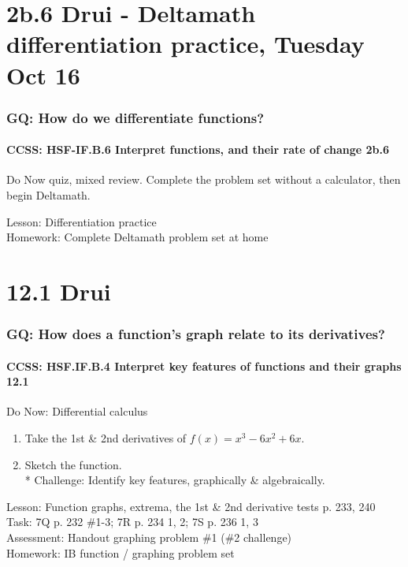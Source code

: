 \documentclass{beamer}
\begin{document}
\section{2b.6 Drui - Deltamath differentiation practice, Tuesday Oct 16}
  \frame
  {
    \frametitle{GQ: How do we differentiate functions?}
    \framesubtitle{CCSS: HSF-IF.B.6 Interpret functions, and their rate of change  \alert{2b.6}}

    \begin{block}{Do Now quiz, mixed review.}
      Complete the problem set without a calculator, then begin Deltamath.
    \end{block} \bigskip

    Lesson: Differentiation practice \\ \bigskip
    Homework: Complete Deltamath problem set at home
  }


\section{12.1 Drui}
  \frame
  {
    \frametitle{GQ: How does a function's graph relate to its derivatives?}
    \framesubtitle{CCSS: HSF.IF.B.4 Interpret key features of functions and their graphs \qquad \alert{12.1}}

    \begin{block}{Do Now: Differential calculus}
    \begin{enumerate}
        \item Take the 1st \& 2nd derivatives of $f(x)=x^3-6x^2+6x$.
        \item Sketch the function.\\*
        Challenge: Identify key features, graphically \& algebraically.
    \end{enumerate}
    \end{block}
    Lesson: Function graphs, extrema, the 1st \& 2nd derivative tests p. 233, 240\\%
    Task: 7Q p. 232 \#1-3; 7R p. 234 1, 2; 7S p. 236 1, 3 \\%
    Assessment: Handout graphing problem \#1 (\#2 challenge)
    \\%
    Homework: IB function / graphing problem set
  }
\end{document}
